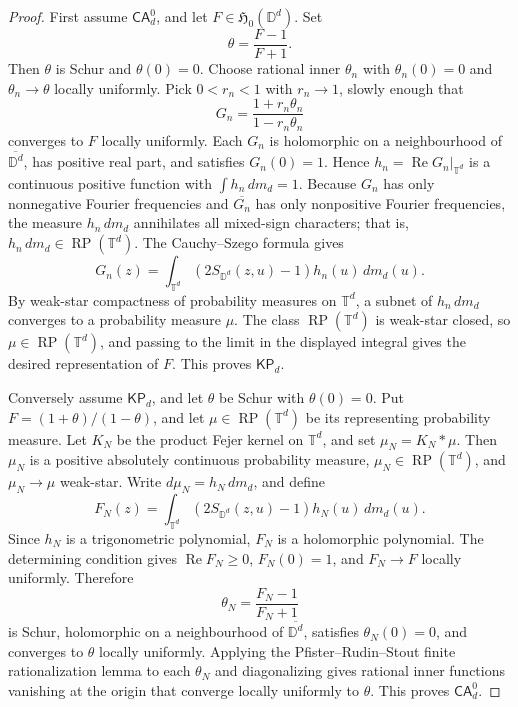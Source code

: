 \documentclass[11pt]{article}
\newcommand{\D}{\mathbb D}
\newcommand{\T}{\mathbb T}
\newcommand{\RP}{\operatorname{RP}}
\begin{document}
\begin{proof}
First assume \(\mathsf{CA}^0_d\), and let \(F\in\mathfrak H_0(\D^d)\).
Set
\[
  \theta=\frac{F-1}{F+1}.
\]
Then \(\theta\) is Schur and \(\theta(0)=0\).  Choose rational inner
\(\theta_n\) with \(\theta_n(0)=0\) and \(\theta_n\to\theta\) locally
uniformly.  Pick \(0<r_n<1\) with \(r_n\to1\), slowly enough that
\[
  G_n=\frac{1+r_n\theta_n}{1-r_n\theta_n}
\]
converges to \(F\) locally uniformly.  Each \(G_n\) is holomorphic on a
neighbourhood of \(\overline{\D^d}\), has positive real part, and satisfies
\(G_n(0)=1\).  Hence \(h_n=\operatorname{Re}G_n|_{\T^d}\) is a continuous
positive function with \(\int h_n\,dm_d=1\).  Because \(G_n\) has only
nonnegative Fourier frequencies and \(\overline{G_n}\) has only
nonpositive Fourier frequencies, the measure \(h_n\,dm_d\) annihilates
all mixed-sign characters; that is, \(h_n\,dm_d\in\RP(\T^d)\).  The
Cauchy--Szego formula gives
\[
  G_n(z)=\int_{\T^d}\left(2S_{\D^d}(z,u)-1\right)h_n(u)\,dm_d(u).
\]
By weak-star compactness of probability measures on \(\T^d\), a subnet of
\(h_n\,dm_d\) converges to a probability measure \(\mu\).  The class
\(\RP(\T^d)\) is weak-star closed, so \(\mu\in\RP(\T^d)\), and passing to
the limit in the displayed integral gives the desired representation of
\(F\).  This proves \(\mathsf{KP}_d\).

Conversely assume \(\mathsf{KP}_d\), and let \(\theta\) be Schur with
\(\theta(0)=0\).  Put \(F=(1+\theta)/(1-\theta)\), and let
\(\mu\in\RP(\T^d)\) be its representing probability measure.  Let
\(K_N\) be the product Fejer kernel on \(\T^d\), and set
\(\mu_N=K_N*\mu\).  Then \(\mu_N\) is a positive absolutely continuous
probability measure, \(\mu_N\in\RP(\T^d)\), and \(\mu_N\to\mu\) weak-star.
Write \(d\mu_N=h_N\,dm_d\), and define
\[
  F_N(z)=\int_{\T^d}\left(2S_{\D^d}(z,u)-1\right)h_N(u)\,dm_d(u).
\]
Since \(h_N\) is a trigonometric polynomial, \(F_N\) is a holomorphic
polynomial.  The determining condition gives \(\operatorname{Re}F_N\geq0\),
\(F_N(0)=1\), and \(F_N\to F\) locally uniformly.  Therefore
\[
  \theta_N=\frac{F_N-1}{F_N+1}
\]
is Schur, holomorphic on a neighbourhood of \(\overline{\D^d}\), satisfies
\(\theta_N(0)=0\), and converges to \(\theta\) locally uniformly.  Applying
the Pfister--Rudin--Stout finite rationalization lemma to each \(\theta_N\)
and diagonalizing gives rational inner functions vanishing at the origin
that converge locally uniformly to \(\theta\).  This proves
\(\mathsf{CA}^0_d\).
\end{proof}
\end{document}
